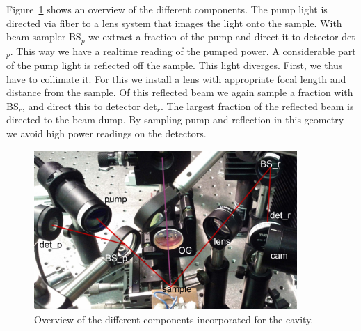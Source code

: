 Figure~\ref{img:overview} shows an overview of the different components.
The pump light is directed via fiber to a lens system that images the light onto the sample.
With beam sampler BS$_p$ we extract a fraction of the pump and direct it to detector det$_p$.
This way we have a realtime reading of the pumped power.
A considerable part of the pump light is reflected off the sample.
This light diverges.
First, we thus have to collimate it.
For this we install a lens with appropriate focal length and distance from the sample.
Of this reflected beam we again sample a fraction with BS$_r$,
and direct this to detector det$_r$.
The largest fraction of the reflected beam is directed to the beam dump.
By sampling pump and reflection in this geometry
we avoid high power readings on the detectors.

\begin{figure}
\centering
\includegraphics[width=10cm]{img/cavity_all.jpg}
\caption{Overview of the different components incorporated for the cavity.}
\label{img:overview}
\end{figure}




